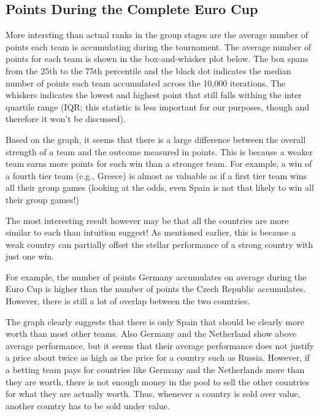 \documentclass{article}\usepackage[]{graphicx}\usepackage[]{color}
\begin{document}
\subsection{Points During the Complete Euro Cup} %



More intersting than actual ranks in the group stages are the average number of points each team is accumulating during the tournament. The average number of points for each team is shown in the box-and-whisker plot below. The box spans from the 25th to the 75th percentile and the black dot indicates the median number of points each team accumulated across the 10,000 iterations. The whiskers indicates the lowest and highest point that still falls withing the inter quartile range (IQR; this statistic is less important for our purposes, though and therefore it won't be discussed). 

Based on the graph, it seems that there is a large difference between the overall strength of a team and the outcome measured in points. This is because a weaker team earns more points for each win than a stronger team. For example, a win of a fourth tier team (e.g., Greece) is almost as valuable as if a first tier team wins all their group games (looking at the odds, even Spain is not that likely to win all their group games!)



The most interesting result however may be that all the countries are more similar to each than intuition suggest! As mentioned earlier, this is because a weak country can partially offset the stellar performance of a strong country with just one win. 

For example, the number of points Germany accumulates on average during the Euro Cup is higher than the number of points the Czech Republic accumulates. However, there is still a lot of overlap between the two countries. 

The graph clearly suggests that there is only Spain that should be clearly more worth than most other teams. Also Germany and the Netherland show above average performance, but it seems that their average performance does not justify a price about twice as high as the price for a country such as Russia. However, if a betting team pays for countries like Germany and the Netherlands more than they are worth, there is not enough money in the pool to sell the other countries for what they are actually worth. Thus, whenever a country is sold over value, another country has to be sold under value.
\end{document}
